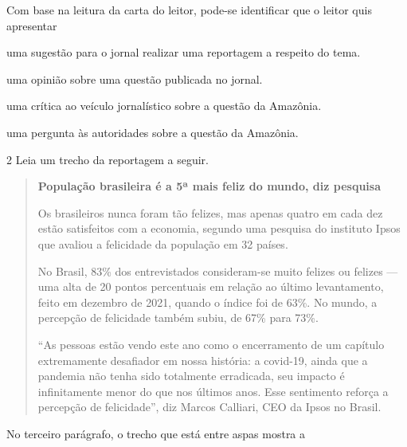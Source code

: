 \begin{conteudo}
\begin{conteudo}
\begin{conteudo}
\begin{conteudo}
\begin{quote}
\end{quote}

Com base na leitura da carta do leitor, pode-se identificar que o leitor
quis apresentar

\begin{escolha}
\item uma sugestão para o jornal realizar uma reportagem a respeito do tema.

\item uma opinião sobre uma questão publicada no jornal.

\item uma crítica ao veículo jornalístico sobre a questão da Amazônia.

\item uma pergunta às autoridades sobre a questão da Amazônia.
\end{escolha}

\num{2} Leia um trecho da reportagem a seguir.

\begin{quote}
\textbf{População brasileira é a 5ª mais feliz do mundo, diz pesquisa}

Os brasileiros nunca foram tão felizes, mas apenas quatro em cada dez
estão satisfeitos com a economia, segundo uma pesquisa do instituto
Ipsos que avaliou a felicidade da população em 32 países.

No Brasil, 83\% dos entrevistados consideram-se muito felizes ou felizes
--- uma alta de 20 pontos percentuais em relação ao último levantamento,
feito em dezembro de 2021, quando o índice foi de 63\%. No mundo, a
percepção de felicidade também subiu, de 67\% para 73\%.

``As pessoas estão vendo este ano como o encerramento de um capítulo
extremamente desafiador em nossa história: a covid-19, ainda que a
pandemia não tenha sido totalmente erradicada, seu impacto é
infinitamente menor do que nos últimos anos. Esse sentimento reforça a
percepção de felicidade'', diz Marcos Calliari, CEO da Ipsos no Brasil.

\end{quote}

No terceiro parágrafo, o trecho que está entre aspas mostra a


\end{conteudo}
\end{conteudo}
\end{conteudo}
\end{conteudo}
